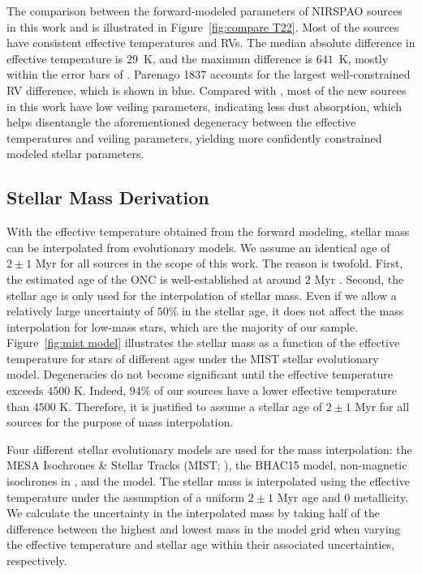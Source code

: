 \documentclass[12pt]{ucsddissertation}
\begin{document}
\begin{CJK*}{UTF8}{gbsn}
The comparison between the forward-modeled parameters of NIRSPAO sources in this work and  is illustrated in Figure~\ref{fig:compare T22}. Most of the sources have consistent effective temperatures and RVs. The median absolute difference in effective temperature is $29$~K, and the maximum difference is $641$~K, mostly within the error bars of . Parenago 1837 accounts for the largest well-constrained RV difference, which is shown in blue. Compared with , most of the new sources in this work have low veiling parameters, indicating less dust absorption, which helps disentangle the aforementioned degeneracy between the effective temperatures and veiling parameters, yielding more confidently constrained modeled stellar parameters.


\subsection{Stellar Mass Derivation}
\label{onc-subsec:mass}

With the effective temperature obtained from the forward modeling, stellar mass can be interpolated from evolutionary models. We assume an identical age of $2\pm1$ Myr for all sources in the scope of this work. The reason is twofold. First, the estimated age of the ONC is well-established at around $2$ Myr \citep[][]{Hillenbrand-1997, Reggiani-2011}. Second, the stellar age is only used for the interpolation of stellar mass. Even if we allow a relatively large uncertainty of $50\%$ in the stellar age, it does not affect the mass interpolation for low-mass stars, which are the majority of our sample. Figure~\ref{fig:mist model} illustrates the stellar mass as a function of the effective temperature for stars of different ages under the MIST stellar evolutionary model. Degeneracies do not become significant until the effective temperature exceeds $4500$ K. Indeed, $94\%$ of our sources have a lower effective temperature than $4500$ K. Therefore, it is justified to assume a stellar age of $2\pm1$ Myr for all sources for the purpose of mass interpolation.

Four different stellar evolutionary models are used for the mass interpolation: the MESA Isochrones \& Stellar Tracks (MIST; \citealt{Dotter-2016, Choi-2016}), the BHAC15 model\citep[][]{Baraffe-2015}, non-magnetic isochrones in \citet{Feiden-2016}, and the \citet{Palla-1999} model. The stellar mass is interpolated using the effective temperature under the assumption of a uniform $2\pm1$ Myr age and $0$ metallicity. We calculate the uncertainty in the interpolated mass by taking half of the difference between the highest and lowest mass in the model grid when varying the effective temperature and stellar age within their associated uncertainties, respectively. 


\end{CJK*}
\end{document}

